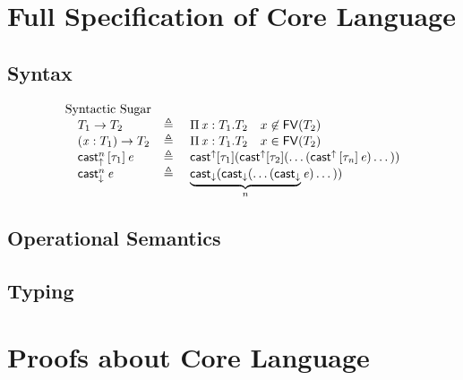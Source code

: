 \newcommand{\FV}{\mathsf{FV}}
\newcommand{\dom}{\mathsf{dom}}

\section{Full Specification of Core Language}

\subsection{Syntax}
\gram{\otte\ottinterrule
        \ottG\ottinterrule
        \ottv}
\[
    \begin{array}{llll}
     \text{Syntactic Sugar}\\
     \quad T_{{\mathrm{1}}}  \rightarrow  T_{{\mathrm{2}}} & \triangleq & \Pi \, \ottmv{x}  \ottsym{:}  T_{{\mathrm{1}}}  \ottsym{.}  T_{{\mathrm{2}}} \quad x \not \in
\FV(T_{{\mathrm{2}}}) \\
     \quad \ottsym{(}  \ottmv{x}  \ottsym{:}  T_{{\mathrm{1}}}  \ottsym{)}  \rightarrow  T_{{\mathrm{2}}} & \triangleq & \Pi \, \ottmv{x}  \ottsym{:}  T_{{\mathrm{1}}}  \ottsym{.}  T_{{\mathrm{2}}} \quad x \in \FV(T_{{\mathrm{2}}})
\\
     \quad \kw{cast}_{\uparrow}^n \, \ottsym{[}  \tau_{{\mathrm{1}}}  \ottsym{]} \,  \ottnt{e} &  \triangleq ~  &  \kw{cast}^{\uparrow}  [ \tau_{{\mathrm{1}}} ] ( \kw{cast}^{\uparrow}  [
\tau_{{\mathrm{2}}} ] (\dots ( \kw{cast}^{\uparrow} \, \ottsym{[}  \tau_{\ottmv{n}}  \ottsym{]} \,  \ottnt{e} ) \dots )) \\
     \quad \kw{cast}_{\downarrow}^n \, \ottnt{e} &  \triangleq ~  & \underbrace{ \kw{cast}_{\downarrow}  ( \kw{cast}_{\downarrow} 
(\dots (  \kw{cast}_{\downarrow} }_n \ottnt{e}) \dots ))
    \end{array}
\]

\subsection{Operational Semantics}
\ottdefnstep{}
\ottusedrule{\ottdruleSXXMu{}}

\subsection{Typing}
\ottdefnctx{}
\ottdefnexpr{}
\ottusedrule{\ottdruleTXXMu{}}

\section{Proofs about Core Language}
